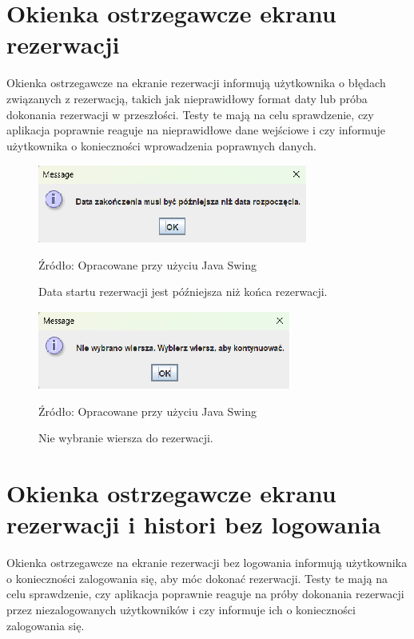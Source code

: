 \section {Okienka ostrzegawcze ekranu rezerwacji}
Okienka ostrzegawcze na ekranie rezerwacji informują użytkownika o błędach związanych z rezerwacją, takich jak nieprawidłowy format daty lub próba dokonania rezerwacji w przeszłości. Testy te mają na celu sprawdzenie, czy aplikacja poprawnie reaguje na nieprawidłowe dane wejściowe i czy informuje użytkownika o konieczności wprowadzenia poprawnych danych.
\begin{figure}[H]
    \centering
    \includegraphics[width=0.8\linewidth]{figures/r4.eps}
    \caption{Data startu rezerwacji jest późniejsza niż końca rezerwacji.}
    \label{fig:reservation_win}
    \small{Źródło: Opracowane przy użyciu Java Swing}
\end{figure}
\clearpage

\begin{figure}[H]
    \centering
    \includegraphics[width=0.8\linewidth]{figures/r5.eps}
    \caption{Nie wybranie wiersza do rezerwacji.}
    \label{fig:reservation_win}
    \small{Źródło: Opracowane przy użyciu Java Swing}   
\end{figure}
\clearpage

\section{Okienka ostrzegawcze ekranu rezerwacji i histori bez logowania}
Okienka ostrzegawcze na ekranie rezerwacji bez logowania informują użytkownika o konieczności zalogowania się, aby móc dokonać rezerwacji. Testy te mają na celu sprawdzenie, czy aplikacja poprawnie reaguje na próby dokonania rezerwacji przez niezalogowanych użytkowników i czy informuje ich o konieczności zalogowania się.

